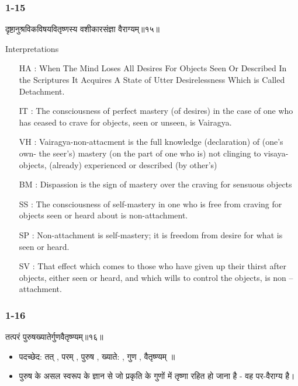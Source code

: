 \begin{frame}[fragile]\frametitle{1-15}
\begin{sanskrit}
दृष्टानुश्रविकविषयवितृष्णस्य वशीकारसंज्ञा वैराग्यम्॥१५॥
\end{sanskrit}

Interpretations
\begin{itemize}		
\item [HA]: When The Mind Loses All Desires For Objects Seen Or Described In the Scriptures It Acquires A State of Utter Desirelessness Which is Called Detachment.
\item [IT]: The consciousness of perfect mastery (of desires) in the case of one who has ceased to crave for objects, seen or unseen, is Vairagya.
\item [VH]: Vairagya-non-attacment is the full knowledge (declaration) of (one’s own- the seer’s) mastery (on the part of one who is) not clinging to visaya-objects, (already) experienced or described (by other’s)
\item [BM]: Dispassion is the sign of mastery over the craving for sensuous objects
\item [SS]: The consciousness of self-mastery in one who is free from craving for objects seen or heard about is non-attachment.
\item [SP]: Non-attachment is self-mastery; it is freedom from desire for what is seen or heard.
\item [SV]: That effect which comes to those who have given up their thirst after objects, either seen or heard, and which wills to control the objects, is non – attachment. 
\end{itemize}
	
\end{frame}


\begin{frame}[fragile]\frametitle{1-16}
\begin{sanskrit}
तत्परं पुरुषख्यातेर्गुणवैतृष्ण्यम्॥१६॥
\end{sanskrit}

\begin{itemize}
\item पदच्छेद: तत् , परम् , पुरुष , ख्याते: , गुण , वैतृष्ण्यम् ॥
\item पुरुष के असल स्वरूप के ज्ञान से जो प्रकृति के गुणों में तृष्णा रहित हो जाना है - वह पर-वैराग्य है।
\end{itemize}

\end{frame}

